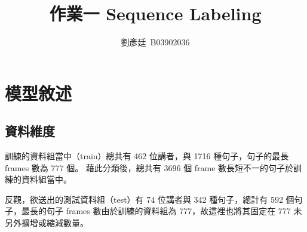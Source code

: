 \documentclass[final,3p]{elsarticle}
\begin{document}
\begin{frontmatter}

\title{作業一 Sequence Labeling}

\author{劉彥廷~B03902036}

\end{frontmatter}


\section{模型敘述}	
	\subsection{資料維度}
		訓練的資料組當中（train）總共有 462 位講者，與 1716 種句子，句子的最長 frames 數為 777 個。
		藉此分類後，總共有 3696 個 frame 數長短不一的句子於訓練的資料組當中。
		
		反觀，欲送出的測試資料組（test）有 74 位講者與 342 種句子，總計有 592 個句子，最長的句子 frames 數由於訓練的資料組為 777，故這裡也將其固定在 777 未另外擴增或縮減數量。
		
\end{document}
